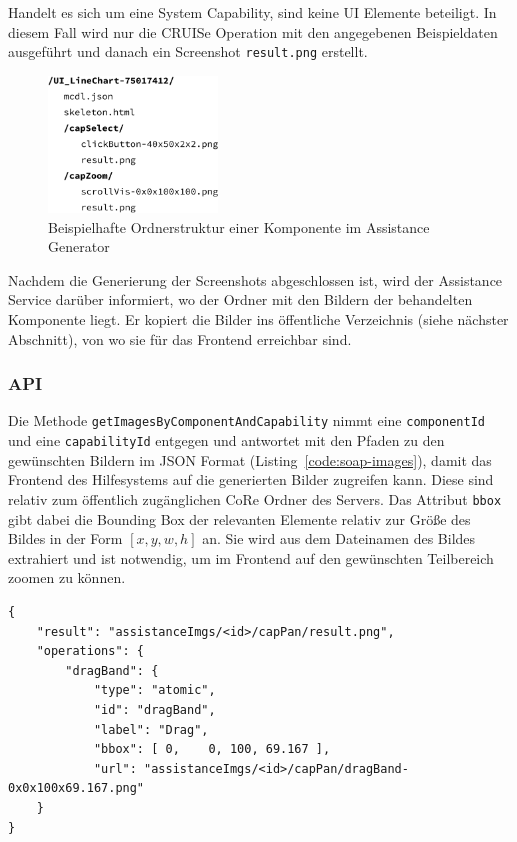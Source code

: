 \documentclass[
	headsepline,
	footsepline,
	fontsize=12pt,
	bibliography=totoc
]{scrbook}
\begin{document}
Handelt es sich um eine System Capability, sind keine UI Elemente beteiligt. In diesem Fall wird nur die CRUISe Operation mit den angegebenen Beispieldaten ausgeführt und danach ein Screenshot \texttt{result.png} erstellt.

\begin{figure}[htbp]
   \centering
   \includegraphics[width=0.4\textwidth]{images/implementierung-ordner.png}
   \caption{Beispielhafte Ordnerstruktur einer Komponente im Assistance Generator}
   \label{figure:ordner}
\end{figure}

Nachdem die Generierung der Screenshots abgeschlossen ist, wird der Assistance Service darüber informiert, wo der Ordner mit den Bildern der behandelten Komponente liegt. Er kopiert die Bilder ins öffentliche Verzeichnis (siehe nächster Abschnitt), von wo sie für das Frontend erreichbar sind.

\subsubsection{API}

Die Methode \texttt{getImagesByComponentAndCapability} nimmt eine \texttt{componentId} und eine \texttt{capabilityId} entgegen und antwortet mit den Pfaden zu den gewünschten Bildern im JSON Format (Listing~\ref{code:soap-images}), damit das Frontend des Hilfesystems auf die generierten Bilder zugreifen kann. Diese sind relativ zum öffentlich zugänglichen CoRe Ordner des Servers. Das Attribut \texttt{bbox} gibt dabei die Bounding Box der relevanten Elemente relativ zur Größe des Bildes in der Form $[ x, y, w, h ]$ an. Sie wird aus dem Dateinamen des Bildes extrahiert und ist notwendig, um im Frontend auf den gewünschten Teilbereich zoomen zu können.

\lstset{language=json}
\begin{lstlisting}[caption={Antwort des SOAP Interfaces}, label=code:soap-images]
{
	"result": "assistanceImgs/<id>/capPan/result.png",
	"operations": {
		"dragBand": {
			"type": "atomic",
			"id": "dragBand",
			"label": "Drag",
			"bbox": [ 0,	0, 100, 69.167 ],
			"url": "assistanceImgs/<id>/capPan/dragBand-0x0x100x69.167.png"
	}
}
\end{lstlisting}
\end{document}
